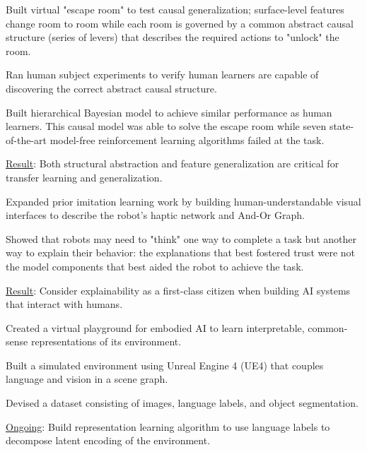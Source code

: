 \begin{cventries}
{\begin{justify}
\end{justify}
\vspace{-1mm}
\begin{cvitems}
  \item Built virtual "escape room" to test causal generalization; surface-level features change room to room while each room is governed by a common abstract causal structure (series of levers) that describes the required actions to "unlock" the room.
  \item Ran human subject experiments to verify human learners are capable of discovering the correct abstract causal structure.
  \item Built hierarchical Bayesian model to achieve similar performance as human learners.  This causal model was able to solve the escape room while seven state-of-the-art model-free reinforcement learning algorithms failed at the task.
  \item \underline{Result}: Both structural abstraction and feature generalization are critical for transfer learning and generalization.
\end{cvitems}
%
\begin{justify}
\end{justify}
\vspace{-1mm}
\begin{cvitems}
  \item Expanded prior imitation learning work by building human-understandable visual interfaces to describe the robot's haptic network and And-Or Graph.
  \item Showed that robots may need to "think" one way to complete a task but another way to explain their behavior: the explanations that best fostered trust were not the model components that best aided the robot to achieve the task.
  \item \underline{Result}: Consider explainability as a first-class citizen when building AI systems that interact with humans.
\end{cvitems}
%
\begin{justify}
\end{justify}
\vspace{-1mm}
\begin{cvitems}
  \item Created a virtual playground for embodied AI to learn interpretable, common-sense representations of its environment.
  \item Built a simulated environment using Unreal Engine 4 (UE4) that couples language and vision in a scene graph.
  \item Devised a dataset consisting of images, language labels, and object segmentation.
  \item \underline{Ongoing}: Build representation learning algorithm to use language labels to decompose latent encoding of the environment.
\end{cvitems}
}


\end{cventries}
